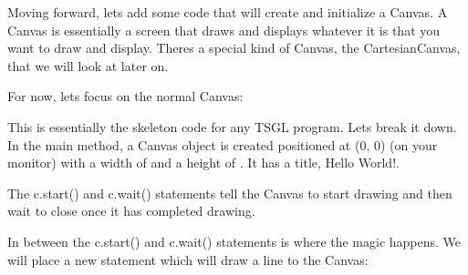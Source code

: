 Moving forward, let\textquotesingle{}s add some code that will create and initialize a Canvas. A Canvas is essentially a screen that draws and displays whatever it is that you want to draw and display. There\textquotesingle{}s a special kind of Canvas, the Cartesian\+Canvas, that we will look at later on.

For now, let\textquotesingle{}s focus on the normal Canvas\+:


\begin{DoxyCode}{0}
\DoxyCodeLine{\}}
\end{DoxyCode}


This is essentially the skeleton code for any T\+S\+GL program. Let\textquotesingle{}s break it down. In the main method, a Canvas object is created positioned at {\ttfamily (0, 0)} (on your monitor) with a width of {} and a height of {}. It has a title, {\ttfamily Hello World!}.

The {\ttfamily c.\+start()} and {\ttfamily c.\+wait()} statements tell the Canvas to start drawing and then wait to close once it has completed drawing.

In between the {\ttfamily c.\+start()} and {\ttfamily c.\+wait()} statements is where the magic happens. We will place a new statement which will draw a line to the Canvas\+:



